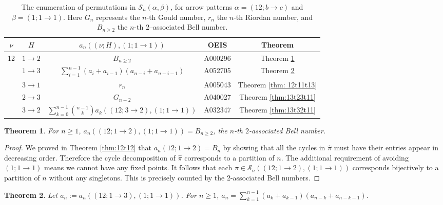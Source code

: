 \documentclass[11pt]{article}
\renewcommand\S{\mathcal S}
\newtheorem{theorem}{Theorem}[section]
\theoremstyle{definition}
\begin{document}
\begin{table}[H]
    \centering
    \begin{tabular}{|c|c|c|c|c|} 
    \hline
         $\nu$ & $H$ & $a_n((\nu;H),(1;1 \to 1))$  & OEIS & Theorem \\ \hline\hline
        \multirow{5}{*}{12}  & $1\to2$ 
        &  $B_{n \geq 2}$ & A000296 & Theorem \ref{thm: 12t11t12} \\ \cline{2-5}
           & $1 \to 3$ 
        & $\sum_{i=1}^{n-1} (a_i + a_{i-1})(a_{n-i} + a_{n-i-1})$ & A052705 & Theorem \ref{thm:12t13t11} \\ \cline{2-5}
        & $3 \to 1$ 
        & $r_n$ & A005043& Theorem \ref{thm: 12t11t13} \\ \cline{2-5}
        & $2 \to 3$ 
        & $G_{n-2}$ & A040027& Theorem \ref{thm:13t23t11} \\ \cline{2-5}
        & $3\to2$ 
        & $\sum_{k=0}^{n-1} \binom{n-1}{k} a_k((12;3\to2),(1;1\to1))$ & A032347 & Theorem \ref{thm:13t32t11} \\ \cline{2-5}
        \hline
        
    \end{tabular}
    \caption{The enumeration of permutations in $\S_n(\alpha,\beta)$, for arrow patterns $\alpha = (12; b \to c)$ and $\beta = (1; 1\to1)$. Here $G_n$ represents the $n$-th Gould number, $r_n$ the $n$-th Riordan number, and $B_{n \geq 2}$ the $n$-th $2$--associated Bell number.}
    \label{tab: 12-11}
\end{table}

\begin{theorem} \label{thm: 12t11t12}
    For $n \geq 1$, $a_n((12;1 \to 2), (1; 1\to1)) = B_{n \geq 2}$, the $n$-th $2$-associated Bell number.
\end{theorem}

\begin{proof}
    We proved in Theorem \ref{thm:12t12} that $a_n(12; 1\to2) = B_n$ by showing that all the cycles in $\hat\pi$ must have their entries appear in decreasing order. Therefore the cycle decomposition of $\hat\pi$ corresponds to a partition of $n$. The additional requirement of avoiding $(1;1\to1)$ means we cannot have any fixed points. It follows that each $\pi\in \S_n((12; 1\to 2), (1;1\to1))$ corresponds bijectively to a partition of $n$ without any singletons. This is precisely counted by the 2-associated Bell numbers.
\end{proof}

\begin{theorem} \label{thm:12t13t11}
    Let $a_n := a_n((12;1 \to 3), (1; 1\to1))$. For $n \geq 1$, $a_n = \sum_{k=1}^{n-1} (a_k + a_{k-1})(a_{n-k} + a_{n-k-1})$.
\end{theorem}
\end{document}
